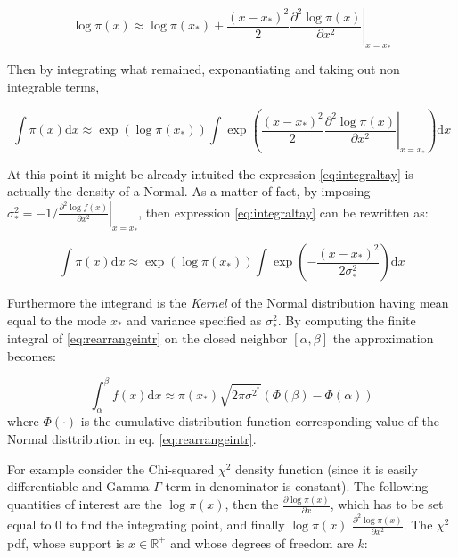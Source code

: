 \documentclass[
  12pt,
  a4paper,
  oneside]{book}
\theoremstyle{definition}
\theoremstyle{definition}
\theoremstyle{definition}
\theoremstyle{remark}
\begin{document}
\[
\log \pi(x) \approx \log \pi\left(x_{*}\right)+\left.\frac{\left(x-x_{*}\right)^{2}}{2} \frac{\partial^{2} \log \pi(x)}{\partial x^{2}}\right|_{x=x_{*}}
\]

Then by integrating what remained, exponantiating and taking out non integrable terms,

\begin{equation}
\int \pi(x) \mathrm{d} x \approx \exp \left(\log \pi\left(x_{*}\right)\right) \int \exp \left(\left.\frac{\left(x-x_{*}\right)^{2}}{2} \frac{\partial^{2} \log \pi(x)}{\partial x^{2}}\right|_{x=x_{*}}\right) \mathrm{d} x
\label{eq:integraltay}
\end{equation}

At this point it might be already intuited the expression \eqref{eq:integraltay} is actually the density of a Normal. As a matter of fact, by imposing \(\sigma^{2}_{*}=-1 /\left.\frac{\partial^{2} \log f(x)}{\partial x^{2}}\right|_{x=x_{*}}\), then expression \eqref{eq:integraltay} can be rewritten as:

\begin{equation}
\int \pi(x) \mathrm{d} x \approx \exp \left(\log \pi\left(x_{*}\right)\right) \int \exp \left(-\frac{\left(x-x_{*}\right)^{2}}{2 \sigma^{2}_{*}}\right) \mathrm{d} x
\label{eq:rearrangeintr}
\end{equation}

Furthermore the integrand is the \emph{Kernel} of the Normal distribution having mean equal to the mode \(x_*\) and variance specified as \(\sigma^{2}_{*}\). By computing the finite integral of \eqref{eq:rearrangeintr} on the closed neighbor \([ \alpha, \beta]\) the approximation becomes:

\[
\int_{\alpha}^{\beta} f(x) \mathrm{d} x \approx \pi\left(x_{*}\right) \sqrt{2 \pi \sigma^{2^{*}}}(\Phi(\beta)-\Phi(\alpha))
\]
where \(\Phi(\cdot)\) is the cumulative distribution function corresponding value of the Normal disttribution in eq. \eqref{eq:rearrangeintr}.

For example consider the Chi-squared \(\chi^{2}\) density function (since it is easily differentiable and Gamma \(\Gamma\) term in denominator is constant). The following quantities of interest are the \(\log \pi(x)\), then the \(\frac{\partial \log \pi(x)}{\partial x}\), which has to be set equal to 0 to find the integrating point, and finally \(\log \pi(x)\) \(\frac{\partial^2 \log \pi(x)}{\partial x^2}\). The \(\chi^{2}\) pdf, whose support is \(x \in \mathbb{R}^{+}\) and whose degrees of freedom are \(k\):
\end{document}
